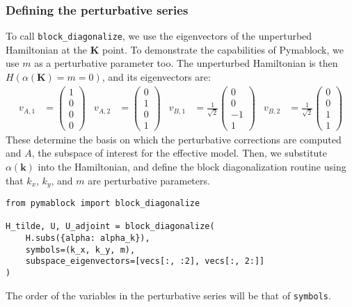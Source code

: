 \subsubsection{Defining the perturbative series}


To call \texttt{block\_diagonalize}, we use the eigenvectors of the unperturbed
Hamiltonian at the $\mathbf{K}$ point.
To demonstrate the capabilities of Pymablock, we use $m$ as a perturbative
parameter too.
The unperturbed Hamiltonian is then $H(\alpha(\mathbf{K}) = m = 0)$, and its
eigenvectors are:
%
\begin{align}
v_{A,1} &= \begin{pmatrix} 1 \\ 0 \\ 0 \\ 0 \end{pmatrix} &
v_{A,2} &= \begin{pmatrix} 0 \\ 1 \\ 0 \\ 1 \end{pmatrix} &
v_{B,1} &= \frac{1}{\sqrt{2}} \begin{pmatrix} 0 \\ 0 \\ -1 \\ 1 \end{pmatrix} &
v_{B,2} &= \frac{1}{\sqrt{2}} \begin{pmatrix} 0 \\ 0 \\ 1 \\ 1 \end{pmatrix}
\end{align}
%
These determine the basis on which the perturbative corrections are computed
and $A$, the subspace of interest for the effective model.
Then, we substitute $\alpha(\mathbf{k})$ into the Hamiltonian, and define the
block diagonalization routine using that $k_x$, $k_y$, and $m$ are perturbative
parameters.
%
\begin{verbatim}
from pymablock import block_diagonalize

H_tilde, U, U_adjoint = block_diagonalize(
    H.subs({alpha: alpha_k}),
    symbols=(k_x, k_y, m),
    subspace_eigenvectors=[vecs[:, :2], vecs[:, 2:]]
)
\end{verbatim}
%
The order of the variables in the perturbative series will be that of \texttt{symbols}.

